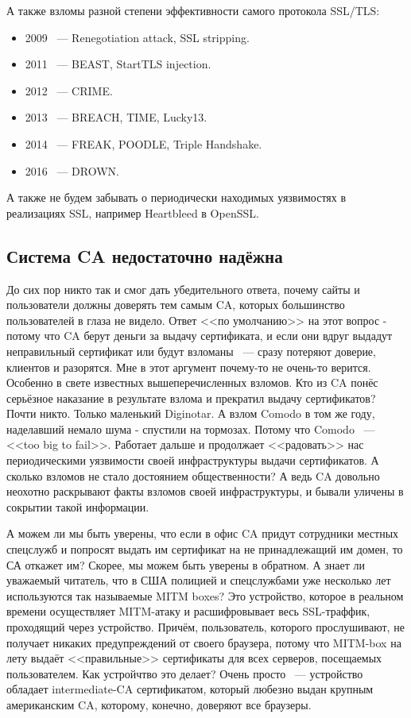 \documentclass[10pt, a5paper]{article}
\begin{document}
А также взломы разной степени эффективности самого протокола SSL/TLS:

\begin{itemize}
  \item 2009 ~--- Renegotiation attack, SSL stripping.
  \item 2011 ~--- BEAST, StartTLS injection.
  \item 2012 ~--- CRIME.
  \item 2013 ~--- BREACH, TIME, Lucky13.
  \item 2014 ~--- FREAK, POODLE, Triple Handshake.
  \item 2016 ~--- DROWN.
\end{itemize}

А также не будем забывать о периодически находимых уязвимостях в
реализациях SSL, например Heartbleed в OpenSSL.

\subsection*{Система CA недостаточно надёжна}

До сих пор никто так и смог дать убедительного ответа, почему сайты и
пользователи должны доверять тем самым CA, которых большинство
пользователей в глаза не видело. Ответ <<по умолчанию>> на этот вопрос -
потому что CA берут деньги за выдачу сертификата, и если они вдруг
выдадут неправильный сертификат или будут взломаны ~--- сразу потеряют
доверие, клиентов и разорятся. Мне в этот аргумент почему-то не
очень-то верится. Особенно в свете известных вышеперечисленных
взломов. Кто из CA понёс серьёзное наказание в результате взлома и
прекратил выдачу сертификатов? Почти никто. Только маленький
Diginotar. А взлом Comodo в том же году, наделавший немало шума -
спустили на тормозах. Потому что Comodo ~--- <<too big to fail>>. Работает
дальше и продолжает <<радовать>> нас периодическими уязвимости своей
инфраструктуры выдачи сертификатов. А сколько взломов не стало
достоянием общественности? А ведь CA довольно неохотно раскрывают
факты взломов своей инфраструктуры, и бывали уличены в сокрытии такой
информации.

А можем ли мы быть уверены, что если в офис CA придут
сотрудники местных спецслужб и попросят выдать им сертификат на не
принадлежащий им домен, то СА откажет им? Скорее, мы можем быть
уверены в обратном. А знает ли уважаемый читатель, что в США полицией
и спецслужбами уже несколько лет используются так называемые MITM
boxes? Это устройство, которое в реальном времени осуществляет
MITM-атаку и расшифровывает весь SSL-траффик, проходящий через
устройство. Причём, пользователь, которого прослушивают, не получает
никаких предупреждений от своего браузера, потому что MITM-box на лету
выдаёт <<правильные>> сертификаты для всех серверов, посещаемых
пользователем. Как устройчтво это делает? Очень просто ~--- устройство
обладает intermediate-CA сертификатом, который любезно выдан крупным
американским CA, которому, конечно, доверяют все браузеры.
\end{document}
